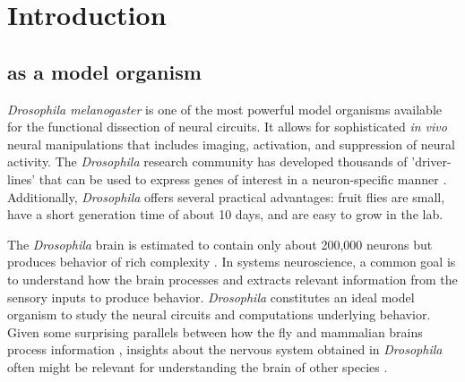 \chapter{Introduction}
\label{chp:Introduction}


\section{\protect{} as a model organism}
\textit{Drosophila melanogaster} is one of the most powerful model organisms available for the functional dissection of neural circuits. It allows for sophisticated \textit{in vivo} neural manipulations that includes imaging, activation, and suppression of neural activity. The \textit{Drosophila} research community has developed thousands of 'driver-lines' that can be used to express genes of interest in a neuron-specific manner \parencite{Pfeiffer2008}. Additionally, \textit{Drosophila} offers several practical advantages: fruit flies are small, have a short generation time of about 10 days, and are easy to grow in the lab. 

The \textit{Drosophila} brain is estimated to contain only about 200,000 neurons \parencite{Raji2021} but produces behavior of rich complexity \parencite{Card2008, Pavlou2013, Ryu2022}. In systems neuroscience, a common goal is to understand how the brain processes and extracts relevant information from the sensory inputs to produce behavior. \textit{Drosophila} constitutes an ideal model organism to study the neural circuits and computations underlying behavior. Given some surprising parallels between how the fly and mammalian brains process information \parencite{Borst2015}, insights about the nervous system obtained in \textit{Drosophila} often might be relevant for understanding the brain of other species \parencite{Bellen2010}.
